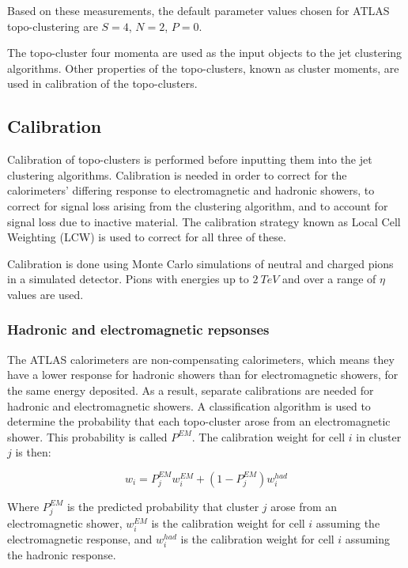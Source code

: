 Based on these measurements, the default parameter values chosen for ATLAS topo-clustering are $S=4$, $N=2$, $P=0$.

The topo-cluster four momenta are used as the input objects to the jet clustering algorithms.
Other properties of the topo-clusters, known as cluster moments, are used in calibration of the topo-clusters.

\subsection{Calibration}\label{subsec:jet_calibration}
Calibration of topo-clusters is performed before inputting them into the jet clustering algorithms.
Calibration is needed in order to correct for the calorimeters' differing response to electromagnetic and hadronic
showers, to correct for signal loss arising from the clustering algorithm, and to account for signal loss due to
inactive material.
The calibration strategy known as Local Cell Weighting (LCW) is used to correct for all three of these.

Calibration is done using Monte Carlo simulations of neutral and charged pions in a simulated detector.
Pions with energies up to $2~TeV$ and over a range of $\eta$ values are used.

\subsubsection{Hadronic and electromagnetic repsonses}\label{subsubsec:hadronic_electromagnetic}
The ATLAS calorimeters are non-compensating calorimeters, which means they have a lower response for hadronic showers
than for electromagnetic showers, for the same energy deposited.
As a result, separate calibrations are needed for hadronic and electromagnetic showers.
A classification algorithm is used to determine the probability that each topo-cluster arose from an electromagnetic
shower.
This probability is called $P^{EM}$.
The calibration weight for cell $i$ in cluster $j$ is then:

\begin{equation}\label{eq:lcw_weights}
    w_i = P_{j}^{EM}w_i^{EM}+\left(1-P^{EM}_j\right)w_i^{had}
\end{equation}

Where $P_j^{EM}$ is the predicted probability that cluster $j$ arose from an electromagnetic shower,
$w_{i}^{EM}$ is the calibration weight for cell $i$ assuming the electromagnetic response, and
$w_{i}^{had}$ is the calibration weight for cell $i$ assuming the hadronic response.\cite{jet-topo-cluster}

